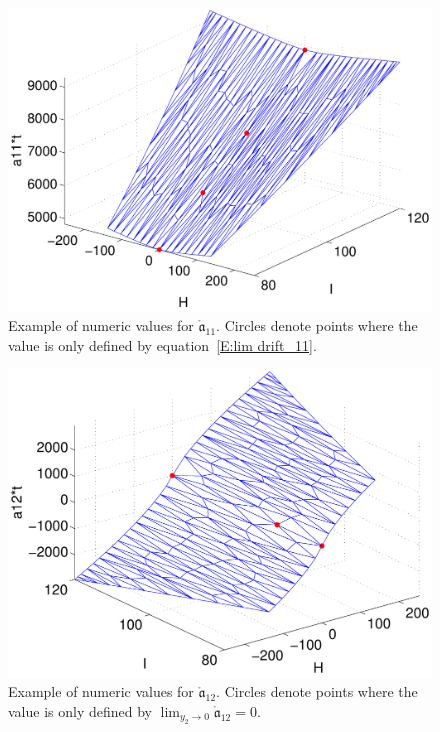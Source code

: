 \begin{figure}
\begin{center}
\includegraphics[width=\textwidth*7/8]{figures/a11_circ}
\caption{Example of numeric values for $\mathring{\mathfrak a}_{11}$. Circles denote points where the value is only defined by equation~\eqref{E:lim drift_11}.}
\label{F:a11_circ}
\end{center}
\end{figure}
\begin{figure}
\begin{center}
\includegraphics[width=\textwidth*7/8]{figures/a12_circ}
\caption{Example of numeric values for $\mathring{\mathfrak a}_{12}$. Circles denote points where the value is only defined by $\lim_{y_2 \to 0} \mathring{\mathfrak a}_{12} = 0$.}
\label{F:a12_circ}
\end{center}
\end{figure}
